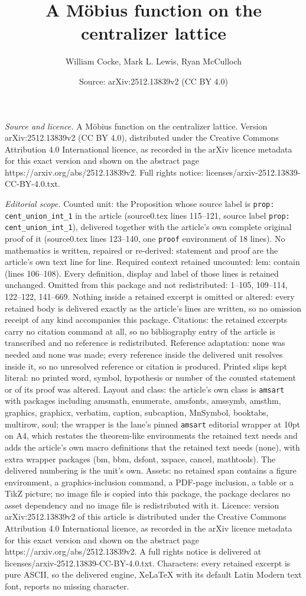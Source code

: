 \documentclass[10pt,a4paper]{amsart}
\title[A M\"obius function on the centralizer lattice]{A M\"obius function on the centralizer lattice}
\author{William Cocke, Mark L. Lewis, Ryan McCulloch}
\date{Source: arXiv:2512.13839v2 (CC BY 4.0)}
\begin{document}
\maketitle

\noindent\emph{Source and licence.} A M\"obius function on the centralizer lattice. Version arXiv:2512.13839v2 (CC BY 4.0), distributed under the Creative Commons Attribution 4.0 International licence, as recorded in the arXiv licence metadata for this exact version and shown on the abstract page https://arxiv.org/abs/2512.13839v2. Full rights notice: licenses/arxiv-2512.13839-CC-BY-4.0.txt.\par\smallskip

\noindent\textit{Editorial scope.} Counted unit: the Proposition whose source label is \texttt{prop: cent\_union\_int\_1} in the article (source0.tex lines 115--121, source label \texttt{prop: cent\_union\_int\_1}), delivered together with the article's own complete original proof of it (source0.tex lines 123--140, one \texttt{proof} environment of 18 lines). No mathematics is written, repaired or re-derived: statement and proof are the article's own text line for line. Required context retained uncounted: lem: contain (lines 106--108). Every definition, display and label of those lines is retained unchanged. Omitted from this package and not redistributed: 1--105, 109--114, 122--122, 141--669. Nothing inside a retained excerpt is omitted or altered: every retained body is delivered exactly as the article's lines are written, so no omission receipt of any kind accompanies this package. Citations: the retained excerpts carry no citation command at all, so no bibliography entry of the article is transcribed and no reference is redistributed. Reference adaptation: none was needed and none was made; every reference inside the delivered unit resolves inside it, so no unresolved reference or citation is produced. Printed slips kept literal: no printed word, symbol, hypothesis or number of the counted statement or of its proof was altered. Layout and class: the article's own class is \texttt{amsart} with packages including amsmath, enumerate, amsfonts, amssymb, amsthm, graphics, graphicx, verbatim, caption, subcaption, MnSymbol, booktabs, multirow, soul; the wrapper is the lane's pinned \texttt{amsart} editorial wrapper at 10pt on A4, which restates the theorem-like environments the retained text needs and adds the article's own macro definitions that the retained text needs (none), with extra wrapper packages (bm, bbm, dsfont, xspace, cancel, mathtools). The delivered numbering is the unit's own. Assets: no retained span contains a figure environment, a graphics-inclusion command, a PDF-page inclusion, a table or a TikZ picture; no image file is copied into this package, the package declares no asset dependency and no image file is redistributed with it. Licence: version arXiv:2512.13839v2 of this article is distributed under the Creative Commons Attribution 4.0 International licence, as recorded in the arXiv licence metadata for this exact version and shown on the abstract page https://arxiv.org/abs/2512.13839v2. A full rights notice is delivered at licenses/arxiv-2512.13839-CC-BY-4.0.txt. Characters: every retained excerpt is pure ASCII, so the delivered engine, XeLaTeX with its default Latin Modern text font, reports no missing character.
\end{document}
